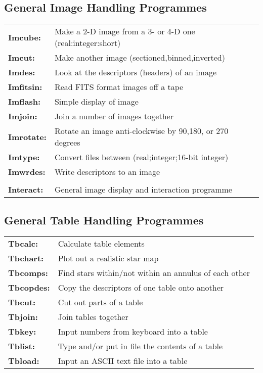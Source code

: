 \subsection{General Image Handling Programmes}

\begin{tabular}{ll}
{\bf  Imcube:} &         Make a 2-D image from a 3- or 4-D one (real:integer:short) \\
{\bf  Imcut:} &          Make another image (sectioned,binned,inverted) \\
{\bf  Imdes:} &          Look at the descriptors (headers) of an image \\
{\bf  Imfitsin:} &       Read FITS format images off a tape \\
{\bf  Imflash:} &        Simple display of image \\
{\bf  Imjoin:} &         Join a number of images together \\
{\bf  Imrotate:} &       Rotate an image anti-clockwise by 90,180, or 270 degrees \\
{\bf  Imtype:} &         Convert files between (real;integer;16-bit integer) \\
{\bf  Imwrdes:} &        Write descriptors to an image \\
{\bf  }          &       \\
{\bf  Interact:} &      General image display and interaction programme \\
\end{tabular}

\subsection{General Table Handling Programmes}

\begin{tabular}{ll}
{\bf  Tbcalc:} &         Calculate table elements \\
{\bf  Tbchart:} &        Plot out a realistic star map \\
{\bf  Tbcomps:} &        Find stars within/not within an annulus of each other \\
{\bf  Tbcopdes:} &       Copy the descriptors of one table onto another \\
{\bf  Tbcut:} &          Cut out parts of a table \\
{\bf  Tbjoin:} &         Join tables together \\
{\bf  Tbkey:} &          Input numbers from keyboard into a table \\
{\bf  Tblist:} &         Type and/or put in file the contents of a table \\
{\bf  Tbload:} &         Input an ASCII text file into a table \\
\end{tabular}

